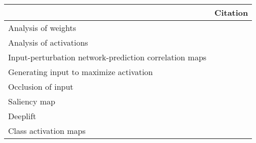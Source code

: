 \begin{tabular}{ll}
\toprule
{} &                                                                                                                                                                                          Citation \\
\midrule
Analysis of weights                                    &  \cite{Perez-Benitez2018, Yoon2018, Langkvist2018, Deiss2018, Lawhern2018, Xu2016, Tsinalis2016a, Nurse2016, Tabar2016a, Zheng2015, Stober2015, Manor2015, Yang2015a, Langkvist2012, Cecotti2011} \\
Analysis of activations                                &                                                                                           \cite{Yuan2018a, Waytowich2018, Lawhern2018, kwak2017, Yin2017a, Supratak2017, Shamwell2016, Manor2015} \\
Input-perturbation network-prediction correlation maps &                                                                                                              \cite{Schirrmeister2017a, Volker2018, Hartmann2018b, Behncke2017, Schirrmeister2017} \\
Generating input to maximize activation                &                                                                                                                                      \cite{VanPutten2018b, Ruffini2018a, Sors2018, Bashivan2016a} \\
Occlusion of input                                     &                                                                                                                                                        \cite{Lee2018, Chambon2018, Thodoroff2016} \\
Saliency map                                           &                                                                                                                                                                               \cite{Vilamala2017} \\
Deeplift                                               &                                                                                                                                                                                \cite{Lawhern2018} \\
Class activation maps                                  &                                                                                                                                                                                  \cite{Ghosh2018} \\

\end{tabular}
